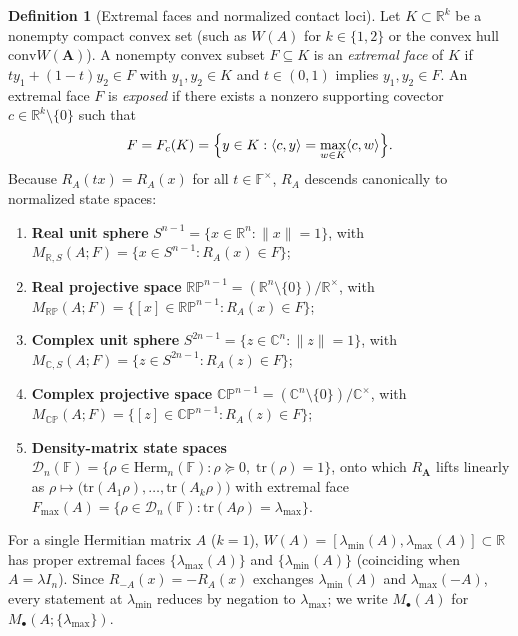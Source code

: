 \documentclass[11pt,a4paper]{article}
\theoremstyle{definition}
\newtheorem{definition}[theorem]{Definition}
\theoremstyle{remark}
\newcommand{\RR}{\mathbb{R}}
\newcommand{\CC}{\mathbb{C}}
\newcommand{\FF}{\mathbb{F}}
\newcommand{\RP}{\mathbb{RP}}
\newcommand{\CP}{\mathbb{CP}}
\newcommand{\cD}{\mathcal{D}}
\newcommand{\Herm}{\mathrm{Herm}}
\newcommand{\tr}{\mathrm{tr}}
\newcommand{\conv}{\mathrm{conv}}
\begin{document}
\begin{definition}[Extremal faces and normalized contact loci]
Let $K \subset \RR^k$ be a nonempty compact convex set (such as $W(A)$ for $k \in \{1, 2\}$ or the convex hull $\conv W(\mathbf{A})$). A nonempty convex subset $F \subseteq K$ is an \emph{extremal face} of $K$ if $t y_1 + (1 - t) y_2 \in F$ with $y_1, y_2 \in K$ and $t \in (0, 1)$ implies $y_1, y_2 \in F$. An extremal face $F$ is \emph{exposed} if there exists a nonzero supporting covector $c \in \RR^k \setminus \{0\}$ such that
\[
  F = F_c(K) = \Bigl\{y \in K : \langle c, y \rangle = \max_{w \in K} \langle c, w \rangle\Bigr\}.
\]
Because $R_A(t x) = R_A(x)$ for all $t \in \FF^\times$, $R_A$ descends canonically to normalized state spaces:
\begin{enumerate}
  \item \textbf{Real unit sphere} $S^{n-1} = \{x \in \RR^n : \|x\| = 1\}$, with $M_{\RR, S}(A; F) = \{x \in S^{n-1} : R_A(x) \in F\}$;
  \item \textbf{Real projective space} $\RP^{n-1} = (\RR^n \setminus \{0\}) / \RR^\times$, with $M_{\RP}(A; F) = \{[x] \in \RP^{n-1} : R_A(x) \in F\}$;
  \item \textbf{Complex unit sphere} $S^{2n-1} = \{z \in \CC^n : \|z\| = 1\}$, with $M_{\CC, S}(A; F) = \{z \in S^{2n-1} : R_A(z) \in F\}$;
  \item \textbf{Complex projective space} $\CP^{n-1} = (\CC^n \setminus \{0\}) / \CC^\times$, with $M_{\CP}(A; F) = \{[z] \in \CP^{n-1} : R_A(z) \in F\}$;
  \item \textbf{Density-matrix state spaces} $\cD_n(\FF) = \{\rho \in \Herm_n(\FF) : \rho \succeq 0,\; \tr(\rho) = 1\}$, onto which $R_{\mathbf{A}}$ lifts linearly as $\rho \mapsto \bigl(\tr(A_1 \rho), \dots, \tr(A_k \rho)\bigr)$ with extremal face $F_{\max}(A) = \{\rho \in \cD_n(\FF) : \tr(A \rho) = \lambda_{\max}\}$.
\end{enumerate}
For a single Hermitian matrix $A$ ($k = 1$), $W(A) = [\lambda_{\min}(A), \lambda_{\max}(A)] \subset \RR$ has proper extremal faces $\{\lambda_{\max}(A)\}$ and $\{\lambda_{\min}(A)\}$ (coinciding when $A = \lambda I_n$). Since $R_{-A}(x) = -R_A(x)$ exchanges $\lambda_{\min}(A)$ and $\lambda_{\max}(-A)$, every statement at $\lambda_{\min}$ reduces by negation to $\lambda_{\max}$; we write $M_{\bullet}(A)$ for $M_{\bullet}(A; \{\lambda_{\max}\})$.
\end{definition}
\end{document}
